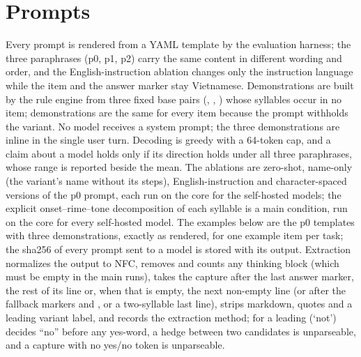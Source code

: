 
\section{Prompts}
\label{app:prompts}

Every prompt is rendered from a YAML template by the evaluation harness; the three paraphrases (p0, p1, p2) carry the same content in different wording and order, and the English-instruction ablation changes only the instruction language while the item and the answer marker  stay Vietnamese. Demonstrations are built by the rule engine from three fixed base pairs (, , ) whose syllables occur in no item;  demonstrations are the same for every item because the prompt withholds the variant. No model receives a system prompt; the three demonstrations are inline in the single user turn. Decoding is greedy with a 64-token cap, and a claim about a model holds only if its direction holds under all three paraphrases, whose range is reported beside the mean. The ablations are zero-shot, name-only (the variant's name without its steps), English-instruction and character-spaced versions of the p0 prompt, each run on the core for the self-hosted models; the explicit onset--rime--tone decomposition of each syllable is a main condition, run on the core for every self-hosted model. The examples below are the p0 templates with three demonstrations, exactly as rendered, for one example item per task; the sha256 of every prompt sent to a model is stored with its output. Extraction normalizes the output to NFC, removes and counts any thinking block (which must be empty in the main runs), takes the capture after the last answer marker, the rest of its line or, when that is empty, the next non-empty line (or after the fallback markers  and , or a two-syllable last line), strips markdown, quotes and a leading variant label, and records the extraction method; for  a leading  (`not') decides ``no'' before any yes-word, a hedge between two candidates is unparseable, and a capture with no yes/no token is unparseable. 

